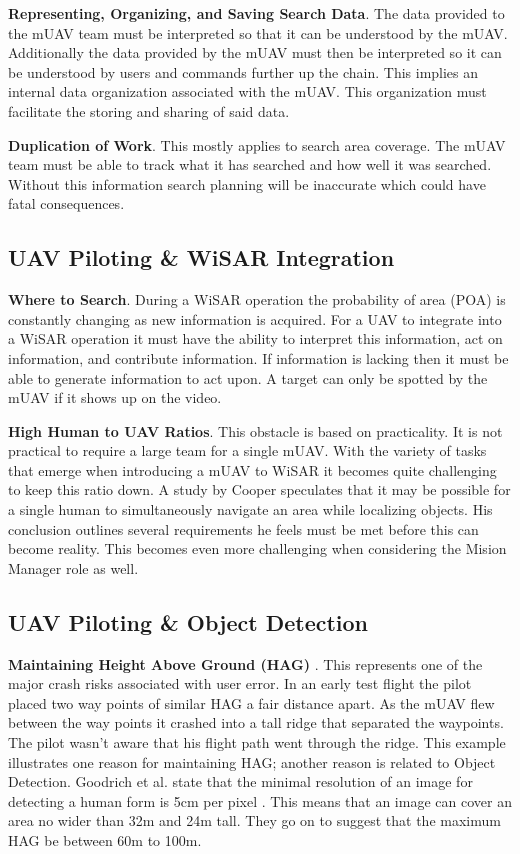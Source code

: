 \textbf{Representing, Organizing, and Saving Search Data}.  The data provided to
the mUAV team must be interpreted so that it can be understood by the mUAV.  Additionally the data
provided by the mUAV must then be interpreted so it can be understood by users
and commands further up the chain.  This implies an internal data organization
associated with the mUAV.  This organization must facilitate the storing and
sharing of said data.

\textbf{Duplication of Work}.  This mostly applies to search area coverage. 
The mUAV team must be able to track what it has searched and how well it
was searched.  Without this information search planning will be inaccurate which
could have fatal consequences.

\subsection{UAV Piloting \& WiSAR Integration}

\textbf{Where to Search}.  During a WiSAR
operation the probability of area (POA) \cite{koester2008lostpersons} is
constantly changing as new information is acquired.  For a UAV to integrate into
a WiSAR operation it must have the ability to interpret this information, act on
information, and contribute information.  If information is lacking then it must
be able to generate information to act upon.  A target can only be spotted by
the mUAV if it shows up on the video.

\textbf{High Human to UAV Ratios}.  This obstacle is based on practicality.  It
is not practical to require a large team for a single mUAV.
With the variety of tasks that emerge when introducing a mUAV to WiSAR it
becomes quite challenging to keep this ratio down.  A study by Cooper 
\cite{cooper2008towards, goodrich2009towards} speculates that it may be possible
for a single human to simultaneously navigate an area while localizing objects. 
His conclusion outlines several requirements he feels must be met before this
can become reality.  This becomes even more challenging when considering the
Mision Manager role as well.

\subsection{UAV Piloting \& Object Detection}
\textbf{Maintaining Height Above Ground (HAG)} \cite{adams2007camera}.
This represents one of the major crash risks associated with user error.  In an
early test flight the pilot placed two way points of similar HAG a fair distance
apart.  As the mUAV flew between the way points it crashed into a tall ridge
that separated the waypoints.  The pilot wasn't aware that his flight path went
through the ridge. This example illustrates one reason for maintaining HAG;
another reason is related to Object Detection.
Goodrich et al. state that the minimal resolution
of an image for detecting a human form is 5cm per pixel
\cite{goodrich2008supporting}.  This means that an image can cover an area no wider than
32m and 24m tall.  They go on to suggest that the
maximum HAG be between 60m to 100m.

